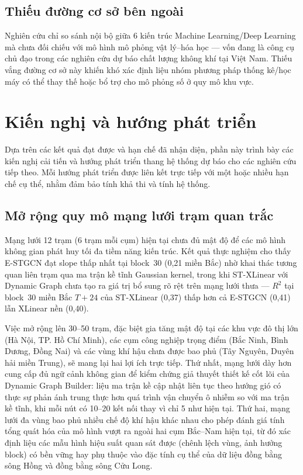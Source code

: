 \subsection{Thiếu đường cơ sở bên ngoài}

Nghiên cứu chỉ so sánh nội bộ giữa 6 kiến trúc Machine Learning/Deep Learning mà chưa đối chiếu với mô hình mô phỏng vật lý--hóa học --- vốn đang là công cụ chủ đạo trong các nghiên cứu dự báo chất lượng không khí tại Việt Nam. Thiếu vắng đường cơ sở này khiến khó xác định liệu nhóm phương pháp thống kê/học máy có thể thay thế hoặc bổ trợ cho mô phỏng số ở quy mô khu vực.

\section{Kiến nghị và hướng phát triển}

Dựa trên các kết quả đạt được và hạn chế đã nhận diện, phần này trình bày các kiến nghị cải tiến và hướng phát triển thang hệ thống dự báo cho các nghiên cứu tiếp theo. Mỗi hướng phát triển được liên kết trực tiếp với một hoặc nhiều hạn chế cụ thể, nhằm đảm bảo tính khả thi và tính hệ thống.

\subsection{Mở rộng quy mô mạng lưới trạm quan trắc}

Mạng lưới 12 trạm (6 trạm mỗi cụm) hiện tại chưa đủ mật độ để các mô hình không gian phát huy tối đa tiềm năng kiến trúc. Kết quả thực nghiệm cho thấy E-STGCN đạt slope thấp nhất tại block~30 (0,21 miền Bắc) nhờ khai thác tương quan liên trạm qua ma trận kề tĩnh Gaussian kernel, trong khi ST-XLinear với Dynamic Graph chưa tạo ra giá trị bổ sung rõ rệt trên mạng lưới thưa --- $R^2$ tại block~30 miền Bắc $T{+}24$ của ST-XLinear (0,37) thấp hơn cả E-STGCN (0,41) lẫn XLinear nền (0,40).

Việc mở rộng lên 30--50 trạm, đặc biệt gia tăng mật độ tại các khu vực đô thị lớn (Hà Nội, TP. Hồ Chí Minh), các cụm công nghiệp trọng điểm (Bắc Ninh, Bình Dương, Đồng Nai) và các vùng khí hậu chưa được bao phủ (Tây Nguyên, Duyên hải miền Trung), sẽ mang lại hai lợi ích trực tiếp. Thứ nhất, mạng lưới dày hơn cung cấp đủ ngữ cảnh không gian để kiểm chứng giả thuyết thiết kế cốt lõi của Dynamic Graph Builder: liệu ma trận kề cập nhật liên tục theo hướng gió có thực sự phản ánh trung thực hơn quá trình vận chuyển ô nhiễm so với ma trận kề tĩnh, khi mỗi nút có 10--20 kết nối thay vì chỉ 5 như hiện tại. Thứ hai, mạng lưới đa vùng bao phủ nhiều chế độ khí hậu khác nhau cho phép đánh giá tính tổng quát hóa của mô hình vượt ra ngoài hai cụm Bắc--Nam hiện tại, từ đó xác định liệu các mẫu hình hiệu suất quan sát được (chênh lệch vùng, ảnh hưởng block) có bền vững hay phụ thuộc vào đặc tính cụ thể của dữ liệu đồng bằng sông Hồng và đồng bằng sông Cửu Long.

